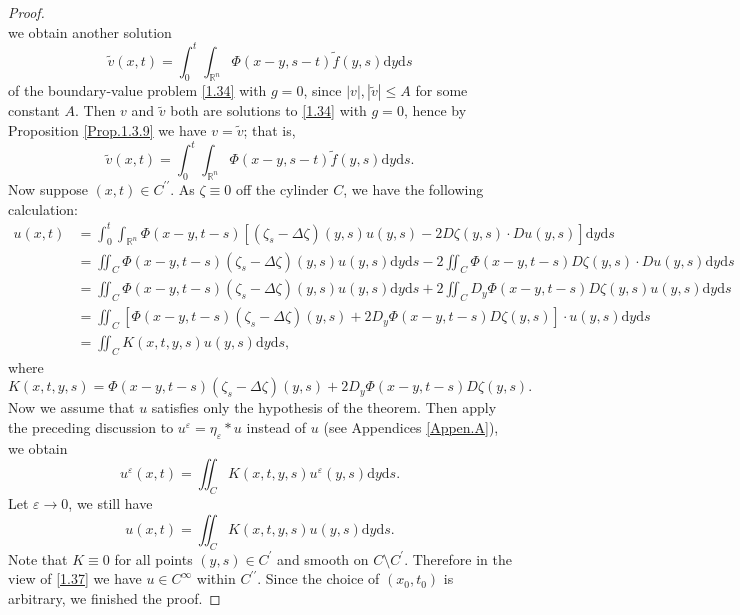 \begin{proof}
$$$$
we obtain another solution 
$$
\widetilde{v}\left( x,t \right) =\int_0^t{\int_{\mathbb{R} ^n}{\Phi \left( x-y,s-t \right) \widetilde{f}\left( y,s \right) \mathrm{d}y}\mathrm{d}s}
$$
of the boundary-value problem \eqref{1.34} with $g=0$, since $|v|,|\widetilde{v}|\le A$ for some constant $A$. Then $v$ and $\widetilde{v}$ both are solutions to \eqref{1.34} with $g=0$, hence by Proposition \ref{Prop.1.3.9} we have $v=\widetilde{v}$; that is, 
$$
\widetilde{v}\left( x,t \right) =\int_0^t{\int_{\mathbb{R} ^n}{\Phi \left( x-y,s-t \right) \widetilde{f}\left( y,s \right) \mathrm{d}y}\mathrm{d}s}.
$$
Now suppose $(x,t)\in C^{\prime\prime}$. As $\zeta\equiv 0$ off the cylinder $C$, we have the following calculation: 
$$
\begin{aligned}
u\left( x,t \right) &=\int_0^t{\int_{\mathbb{R} ^n}{\Phi \left( x-y,t-s \right) \left[ \left( \zeta _s-\Delta \zeta \right) \left( y,s \right) u\left( y,s \right) -2D\zeta \left( y,s \right) \cdot Du\left( y,s \right) \right] \mathrm{d}y}\mathrm{d}s}
\\
&=\iint_C{\Phi \left( x-y,t-s \right) \left( \zeta _s-\Delta \zeta \right) \left( y,s \right) u\left( y,s \right) \mathrm{d}y\mathrm{d}s}-2\iint_C{\Phi \left( x-y,t-s \right) D\zeta \left( y,s \right) \cdot Du\left( y,s \right) \mathrm{d}y\mathrm{d}s}
\\
&=\iint_C{\Phi \left( x-y,t-s \right) \left( \zeta _s-\Delta \zeta \right) \left( y,s \right) u\left( y,s \right) \mathrm{d}y\mathrm{d}s}+2\iint_C{D_y\Phi \left( x-y,t-s \right) D\zeta \left( y,s \right) u\left( y,s \right) \mathrm{d}y\mathrm{d}s}
\\
&=\iint_C{\left[ \Phi \left( x-y,t-s \right) \left( \zeta _s-\Delta \zeta \right) \left( y,s \right) +2D_y\Phi \left( x-y,t-s \right) D\zeta \left( y,s \right) \right] \cdot u\left( y,s \right) \mathrm{d}y\mathrm{d}s}
\\
&=\iint_C{K\left( x,t,y,s \right) u\left( y,s \right) \mathrm{d}y\mathrm{d}s},
\end{aligned}
$$
where 
$$
K\left( x,t,y,s \right) =\Phi \left( x-y,t-s \right) \left( \zeta _s-\Delta \zeta \right) \left( y,s \right) +2D_y\Phi \left( x-y,t-s \right) D\zeta \left( y,s \right) .
$$
Now we assume that $u$ satisfies only the hypothesis of the theorem. Then apply the preceding discussion to $u^\varepsilon=\eta_\varepsilon*u$ instead of $u$ (see Appendices \ref{Appen.A}), we obtain 
$$
u^{\varepsilon}\left( x,t \right) =\iint_C{K\left( x,t,y,s \right) u^{\varepsilon}\left( y,s \right) \mathrm{d}y\mathrm{d}s}.
$$
Let $\varepsilon\to 0$, we still have 
\begin{equation}\label{1.37}
u\left( x,t \right) =\iint_C{K\left( x,t,y,s \right) u\left( y,s \right) \mathrm{d}y\mathrm{d}s}.
\end{equation}
Note that $K\equiv 0$ for all points $(y,s)\in C^\prime$ and smooth on $C\setminus C^\prime$. Therefore in the view of \eqref{1.37} we have $u\in C^\infty$ within $C^{\prime\prime}$. Since the choice of $(x_0,t_0)$ is arbitrary, we finished the proof.
\end{proof}
